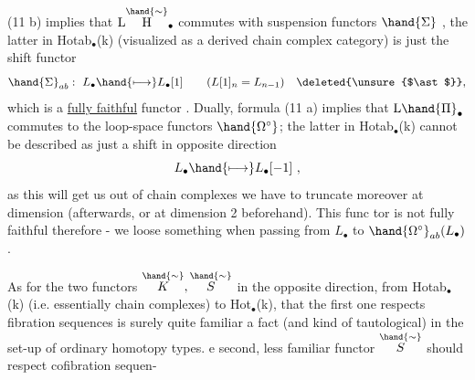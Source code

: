  (11 b) implies that $\mathrm{L}\overset{\hand{\sim}}{\mathrm{H}}_{\bullet}$ commutes with suspension functors $\hand{\Sigma}$ ,
the latter in Hotab$_{\bullet}$(k) (visualized as a derived chain complex category)
is just the shift functor
\[ \hand{\Sigma}_{ab} : \ L_{\bullet} \hand{\longmapsto} L_{\bullet}[1] \qquad ( L[1]_{n} = L_{n-1}) \quad \deleted{\unsure{$\ast$}} , \]
which is a \uline{fully faithful} functor . Dually, formula (11 a) implies
that $\mathrm{L}\hand{\Pi}_{\bullet}$ commutes to the loop-space functors $\hand{\Omega^{\circ}}$; the latter in
Hotab$_{\bullet}$(k) cannot be described as just a shift in opposite direction
\[ L_{\bullet} \hand{\longmapsto} L_{\bullet}[-1] \ , \]
as this will get us out of  chain complexes we have to truncate moreover
at dimension  (afterwards, or at dimension  2 beforehand). This func%
tor is not fully faithful therefore - we loose something when passing
from $L_{\bullet}$ to $\hand{\Omega^{\circ}}_{ab}(L_{\bullet})$.

As for the two functors $\overset{\hand{\sim}}{K},\overset{\hand{\sim}}{S}$  in the opposite direction, from
Hotab$_{\bullet}$(k) (i.e. essentially chain complexes) to Hot$_{\bullet}$(k), that the
first one respects fibration sequences is surely quite familiar a fact
(and kind of tautological) in the set-up of ordinary homotopy types. 
e second, less familiar functor $\overset{\hand{\sim}}{S}$ should respect cofibration sequen-%


